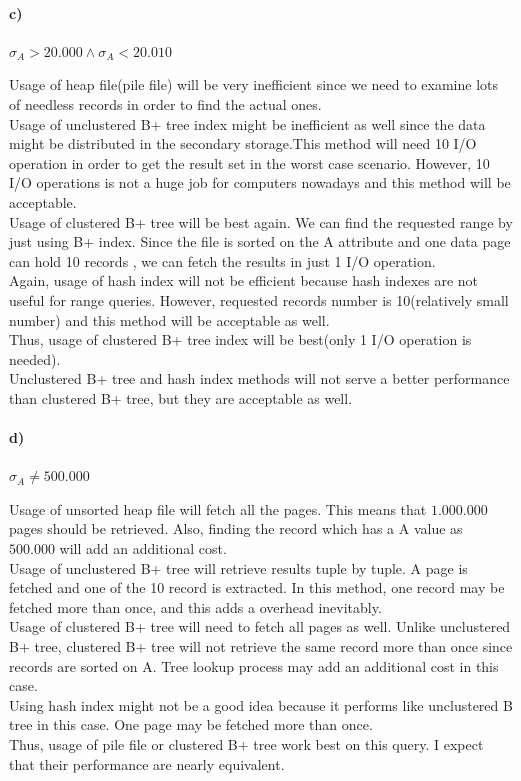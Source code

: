 \documentclass[a4paper,12pt]{article}
\begin{document}
\paragraph{c)}$\sigma_A>20.000 \wedge \sigma_A<20.010$

\begin{tcolorbox}
Usage of heap file(pile file) will be very inefficient since we need to examine lots of needless records in order to find the actual ones.\\
Usage of unclustered B+ tree index might be inefficient as well since the data might be distributed in the secondary storage.This method will need 10 I/O operation in order to get the result set in the worst case scenario. However, 10 I/O operations is not a huge job for computers nowadays and  this method will be acceptable. \\
Usage of clustered B+ tree will be best again. We can find the requested range by just using B+ index. Since the file is sorted on the A attribute and one data page can hold 10 records , we can fetch the results in just 1 I/O operation.\\
Again, usage of hash index will not be efficient because hash indexes are not useful for range queries. However, requested records number is 10(relatively small number) and this method will be acceptable as well. \\
Thus, usage of clustered B+ tree index will be best(only 1 I/O operation is needed).\\
Unclustered B+ tree and hash index methods will not serve a better performance than clustered B+ tree, but they are acceptable as well.
\end{tcolorbox}

\paragraph{d)}$\sigma_A\neq 500.000$

\begin{tcolorbox}
Usage of unsorted heap file will fetch all the pages. This means that $1.000.000$ pages should be retrieved. Also, finding the record which has a A value as $500.000$ will add an additional cost.\\
Usage of unclustered B+ tree will retrieve results tuple by tuple. A page is fetched and one of the 10 record is extracted. In this method, one record may be fetched more than once, and this adds a overhead inevitably.\\
Usage of clustered B+ tree will need to fetch all pages as well. Unlike unclustered B+ tree, clustered B+ tree will not retrieve the same record more than once since records are sorted on A. Tree lookup process may add an additional cost in this case.\\
Using hash index might not be a good idea because it performs like unclustered B tree in this case. One page may be fetched more than once.\\
Thus, usage of pile file or clustered B+ tree work best on this query. I expect that their performance are nearly equivalent.
\end{tcolorbox}
\end{document}
